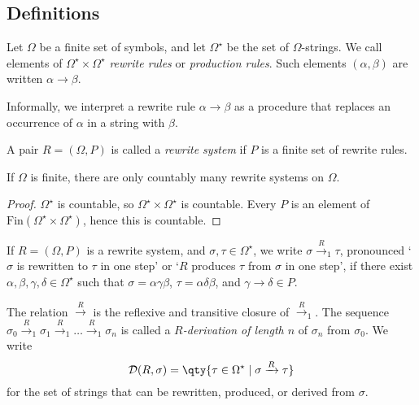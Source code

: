 \subsection{Definitions}
\begin{definition}
	Let \( \Omega \) be a finite set of symbols, and let \( \Omega^\star \) be the set of \( \Omega \)-strings.
	We call elements of \( \Omega^\star \times \Omega^\star \) \emph{rewrite rules} or \emph{production rules}.
	Such elements \( (\alpha, \beta) \) are written \( \alpha \to \beta \).
\end{definition}
Informally, we interpret a rewrite rule \( \alpha \to \beta \) as a procedure that replaces an occurrence of \( \alpha \) in a string with \( \beta \).
\begin{definition}
	A pair \( R = (\Omega, P) \) is called a \emph{rewrite system} if \( P \) is a finite set of rewrite rules.
\end{definition}
\begin{proposition}
	If \( \Omega \) is finite, there are only countably many rewrite systems on \( \Omega \).
\end{proposition}
\begin{proof}
	\( \Omega^\star \) is countable, so \( \Omega^\star \times \Omega^\star \) is countable.
	Every \( P \) is an element of \( \mathrm{Fin}(\Omega^\star \times \Omega^\star) \), hence this is countable.
\end{proof}
\begin{definition}
	If \( R = (\Omega, P) \) is a rewrite system, and \( \sigma, \tau \in \Omega^\star \), we write \( \sigma \xrightarrow R_1 \tau \), pronounced `\( \sigma \) is rewritten to \( \tau \) in one step' or `\( R \) produces \( \tau \) from \( \sigma \) in one step', if there exist \( \alpha, \beta, \gamma, \delta \in \Omega^\star \) such that \( \sigma = \alpha \gamma \beta \), \( \tau = \alpha \delta \beta \), and \( \gamma \to \delta \in P \).

	The relation \( \xrightarrow R \) is the reflexive and transitive closure of \( \xrightarrow R_1 \).
	The sequence \( \sigma_0 \xrightarrow R_1 \sigma_1 \xrightarrow R_1 \dots \xrightarrow R_1 \sigma_n \) is called a \emph{\( R \)-derivation of length \( n \)} of \( \sigma_n \) from \( \sigma_0 \).
	We write
	\[ \mathcal D(R, \sigma) = \qty{\tau \in \Omega^\star \mid \sigma \xrightarrow R \tau} \]
	for the set of strings that can be rewritten, produced, or derived from \( \sigma \).
\end{definition}

